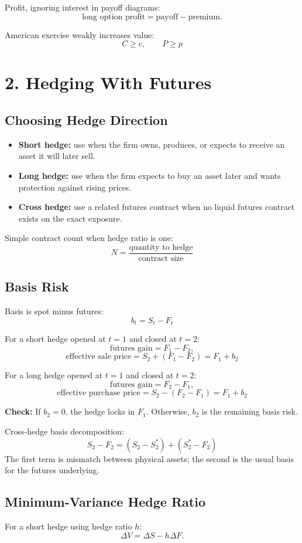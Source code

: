 \documentclass[10pt]{article}
\newcommand{\formula}[1]{\[
    \boxed{\displaystyle #1}
\]}
\newcommand{\note}[1]{\textcolor{accent}{\textbf{Check:}} #1}
\begin{document}
\begin{multicols}{2}
Profit, ignoring interest in payoff diagrams:
\[
    \text{long option profit}=\text{payoff}-\text{premium}.
\]

American exercise weakly increases value:
\formula{C\geq c,\qquad P\geq p}

\section*{2. Hedging With Futures}

\subsection*{Choosing Hedge Direction}
\begin{itemize}
    \item \textbf{Short hedge:} use when the firm owns, produces, or expects to receive an asset it will later sell.
    \item \textbf{Long hedge:} use when the firm expects to buy an asset later and wants protection against rising prices.
    \item \textbf{Cross hedge:} use a related futures contract when no liquid futures contract exists on the exact exposure.
\end{itemize}

Simple contract count when hedge ratio is one:
\formula{N=\frac{\text{quantity to hedge}}{\text{contract size}}}

\subsection*{Basis Risk}
Basis is spot minus futures:
\formula{b_t=S_t-F_t}

For a short hedge opened at $t=1$ and closed at $t=2$:
\[
    \text{futures gain}=F_1-F_2,
\]
\formula{\text{effective sale price}=S_2+(F_1-F_2)=F_1+b_2}

For a long hedge opened at $t=1$ and closed at $t=2$:
\[
    \text{futures gain}=F_2-F_1,
\]
\formula{\text{effective purchase price}=S_2-(F_2-F_1)=F_1+b_2}

\note{If $b_2=0$, the hedge locks in $F_1$. Otherwise, $b_2$ is the remaining basis risk.}

Cross-hedge basis decomposition:
\formula{S_2-F_2=(S_2-S_2^*)+(S_2^*-F_2)}
The first term is mismatch between physical assets; the second is the usual basis for the futures underlying.

\subsection*{Minimum-Variance Hedge Ratio}
For a short hedge using hedge ratio $h$:
\[
    \Delta V=\Delta S-h\Delta F.
\]


\end{multicols}
\end{document}

